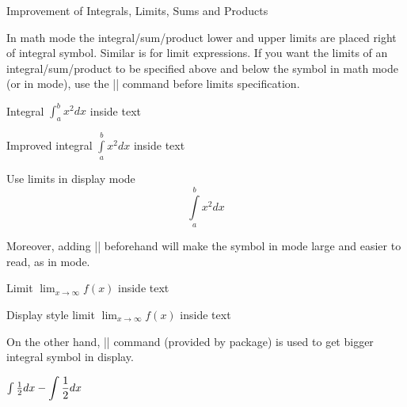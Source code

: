 \begin{frame}[fragile]{Improvement of Integrals, Limits, Sums and Products}

In  math mode the integral/sum/product lower and upper limits are placed right of integral symbol. Similar is for limit expressions. If you want the limits of an integral/sum/product to be specified above and below the symbol in  math mode (or in  mode), use the \LC|\limits| command before limits specification.

\begin{latexexample}
Integral $\int_{a}^{b} x^2 dx$ inside text \par
Improved integral $\int\limits_{a}^{b} x^2 dx$ inside text \par
Use limits in display mode \[ \int\limits_{a}^{b} x^2 dx \]
\end{latexexample}

\end{frame}

\begin{frame}[fragile]

Moreover, adding \LC|\displaystyle| beforehand will make the symbol in  mode large and easier to read, as in  mode.

\begin{latexexample}
Limit $\lim_{x\to\infty} f(x)$ inside text \par
Display style limit $\displaystyle\lim_{x\to\infty} f(x)$ inside text 
\end{latexexample}

On the other hand, \LC|\mathlarger| command (provided by  package) is used to get bigger integral symbol in display.

\begin{latexexample}
$\int\frac{1}{2}dx - \mathlarger{ \int\frac{1}{2}dx}$
\end{latexexample}

\end{frame}

